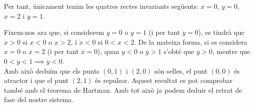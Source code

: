 \documentclass[10pt,a4paper]{article}
\begin{document}
Per tant, únicament tenim les quatres rectes invariants següents: $x=0$, $y=0$, $x=2$ i $y=1$.

\par
Fixem-nos ara que, si considerem $y=0$ o $y=1$ (i per tant $\dot{y}=0$), es tindrà que $\dot{x}>0$ si $x<0$ o $x>2$, i $\dot{x}<0$ si $0<x<2$. De la mateixa forma, si es considera $x=0$ o $x=2$ (i per tant $\dot{x}=0$), quan $y<0$ o $y>1$ s'obté que $\dot{y}>0$, mentre que $0<y<1 \implies \dot{y}<0$.
\\ Amb això deduïm que els punts $(0, 1)$ i $(2, 0)$ són selles, el punt $(0,0)$ és atractor i que el punt $(2,1)$ és repulsor. Aquest resultat es pot comprobar també amb el teorema de Hartman. Amb tot això ja podem deduir el retrat de fase del nostre sistema.

\begin{center}
  \begin{minipage}{\linewidth}
    \centering
    
  \end{minipage}
\end{center}
\end{document}

